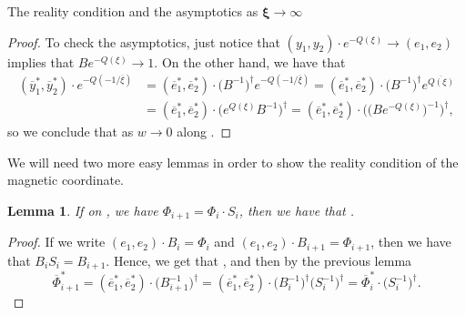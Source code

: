 \documentclass[11pt]{article}
\numberwithin{equation}{section}
\newtheorem{Lemma}[Theorem]{Lemma}
\numberwithin{equation}{section}
\begin{document}
\begin{subsubsection}{The reality condition and the asymptotics as $\boldsymbol{\xi \to \infty}$}
\begin{proof}
To check the asymptotics, just notice that $(y_1,y_2)\cdot e^{-Q(\xi)} \to (e_1,e_2)$ implies that $Be^{-Q(\xi)}\to 1$. On the other hand, we have that
\begin{align*}
 (\overline{y}_1^{*},\overline{y}_2^{*})\cdot e^{-Q(-1/\overline{\xi})}&=(\overline{e}_1^*,\overline{e}_2^*)\cdot \bigl(B^{-1}\bigr)^{\dagger}e^{-Q(-1/\overline{\xi})}=(\overline{e}_1^*,\overline{e}_2^*)\cdot \bigl(B^{-1}\bigr)^{\dagger}e^{\overline{Q(\xi)}}\\
 &=(\overline{e}_1^*,\overline{e}_2^*)\cdot \bigl(e^{Q(\xi)}B^{-1}\bigr)^{\dagger}=(\overline{e}_1^*,\overline{e}_2^*)\cdot \bigl(\bigl(Be^{-Q(\xi)}\bigr)^{-1}\bigr)^{\dagger},
\end{align*}
so we conclude that  as $w\to 0$ along .
\end{proof}

 We will need two more easy lemmas in order to show the reality condition of the magnetic coordinate.

 \begin{Lemma}
 If on , we have $\Phi_{i+1}\!=\!\Phi_i \cdot S_i$, then we have that .
 \end{Lemma}

 \begin{proof}
 If we write $(e_1,e_2)\cdot B_i=\Phi_i$ and $(e_1,e_2)\cdot B_{i+1}=\Phi_{i+1}$, then we have that $B_iS_i=B_{i+1}$. Hence, we get that , and then by the previous lemma
 \begin{equation*}
 \overline{\Phi}_{i+1}^{*}=(\overline{e}_1^*,\overline{e}_2^*)\cdot \bigl(B_{i+1}^{-1}\bigr)^{\dagger}=(\overline{e}_1^*,\overline{e}_2^*)\cdot \bigl(B_i^{-1}\bigr)^{\dagger}\bigl(S_i^{-1}\bigr)^{\dagger}=\overline{\Phi}_{i}^{*}\cdot\bigl(S_i^{-1}\bigr)^{\dagger}.\tag*{\qed}
 \end{equation*}\renewcommand{\qed}{}
 \end{proof}


\end{subsubsection}
\end{document}
